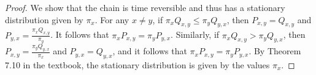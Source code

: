 \documentclass{article}
\begin{document}
\begin{proof}
    We show that the chain is time reversible and thus has a stationary
    distribution given by $\pi_x$. For any $x \neq y$, if $\pi_x Q_{x, y} \leq
    \pi_y Q_{y, x}$, then $P_{x, y} = Q_{x, y}$ and $P_{y, x} = \frac{\pi_x
    Q_{x, y}}{\pi_y}$.  It follows that $\pi_x P_{x, y} = \pi_y P_{y, x}$.
    Similarly, if $\pi_x Q_{x, y} > \pi_y Q_{y, x}$, then $P_{x, y} =
    \frac{\pi_y Q_{y, x}}{\pi_x}$ and $P_{y, x} = Q_{y, x}$, and it follows
    that $\pi_x P_{x, y} = \pi_y P_{y, x}$. By Theorem 7.10 in the textbook,
    the stationary distribution is given by the values $\pi_x$.
\end{proof}
\end{document}
